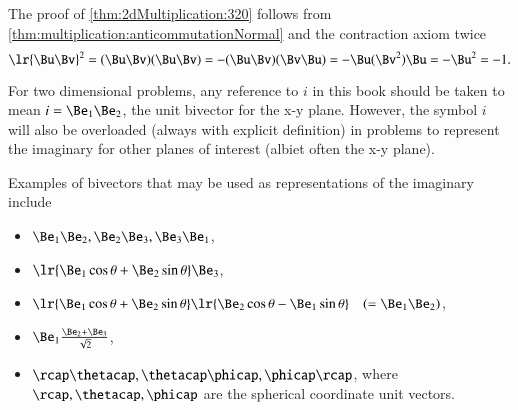 %
%

The proof of \cref{thm:2dMultiplication:320} follows from \cref{thm:multiplication:anticommutationNormal} and the
contraction axiom twice
\begin{dmath}\label{eqn:2dMultiplication:220}
   \lr{ \Bu \Bv }^2
   =
   (\Bu \Bv)(\Bu \Bv)
   =
   -(\Bu \Bv)(\Bv \Bu)
   =
   -\Bu (\Bv^2 ) \Bu
   =
   -\Bu^2
   = -1.
\end{dmath}

For two dimensional problems, any reference to \( i \) in this book should be taken to mean \( i = \Be_1 \Be_2 \), the unit bivector for the x-y plane.
However, the symbol \( i \) will also be overloaded (always with explicit definition) in  problems to represent the imaginary for other planes of interest (albiet often the x-y plane).

Examples of bivectors that may be used as representations of the imaginary include
\begin{itemize}
\item \( \Be_1 \Be_2, \Be_2 \Be_3, \Be_3 \Be_1 \),
\item \( \lr{ \Be_1 \cos\theta + \Be_2 \sin\theta } \Be_3 \),
\item \( \lr{ \Be_1 \cos\theta + \Be_2 \sin\theta } \lr{ \Be_2 \cos\theta - \Be_1 \sin\theta } \quad (= \Be_1 \Be_2)\),
\item \( \Be_1 \frac{ \Be_2 + \Be_3}{\sqrt{2}} \),
\item \( \rcap \thetacap, \thetacap \phicap, \phicap \rcap \), where \( \rcap, \thetacap, \phicap \) are the spherical coordinate unit vectors.
\end{itemize}




